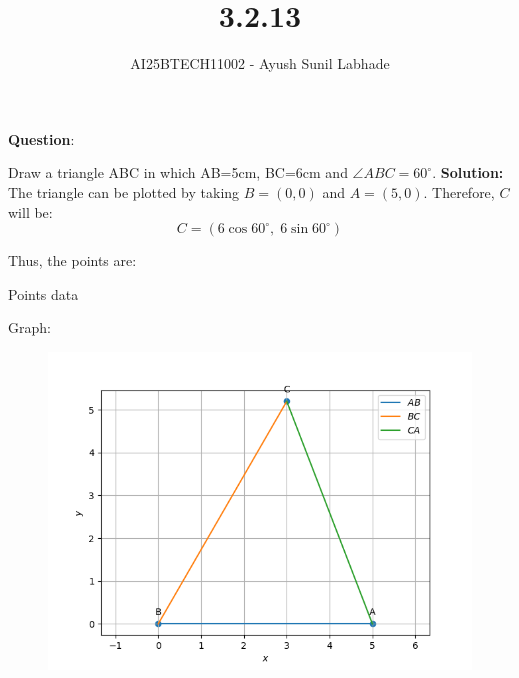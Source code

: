 \documentclass[journal,12pt,onecolumn]{IEEEtran}
\begin{document}
\title{3.2.13}
\author{AI25BTECH11002 - Ayush Sunil Labhade}
{\let\newpage\relax\maketitle}

\textbf{Question}:\newline

Draw a triangle ABC in which AB=5cm, BC=6cm and $\angle ABC=60^\circ$.
\newline
\textbf{Solution:}\newline
The triangle can be plotted by taking $B = (0,0)$ and $A = (5,0)$.
Therefore, $C$ will be:
\[
C = (6\cos 60^\circ,\;6\sin 60^\circ)
\]

Thus, the points are:
\begin{table}[H]
    \centering
    
    \caption{Points data}
    \label{tab:points}
\end{table}

Graph:
\begin{figure}[H]
    \centering
    \includegraphics[scale=0.5]{plot}
    \caption{}
    \label{fig:plot}
\end{figure}
\end{document}
